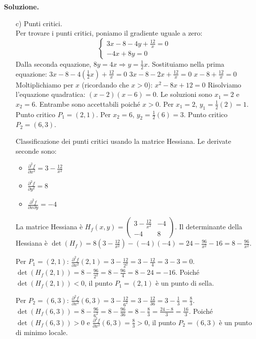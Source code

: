 \documentclass[12pt, a4paper]{article}
\newenvironment{solution}{%
    \par\noindent\textbf{Soluzione.}\medskip\par
    \normalfont
}{\par\bigskip}
\begin{document}
\begin{solution}
\begin{enumerate}
    \item[c)] Punti critici.\\
    Per trovare i punti critici, poniamo il gradiente uguale a zero:
    \[ \begin{cases} 3x - 8 - 4y + \frac{12}{x} = 0 \\ -4x + 8y = 0 \end{cases} \]
    Dalla seconda equazione, \(8y = 4x \Rightarrow y = \frac{1}{2}x\).
    Sostituiamo nella prima equazione:
    \( 3x - 8 - 4(\frac{1}{2}x) + \frac{12}{x} = 0 \)
    \( 3x - 8 - 2x + \frac{12}{x} = 0 \)
    \( x - 8 + \frac{12}{x} = 0 \)
    Moltiplichiamo per \(x\) (ricordando che \(x>0\)):
    \( x^2 - 8x + 12 = 0 \)
    Risolviamo l'equazione quadratica: \( (x-2)(x-6) = 0 \).
    Le soluzioni sono \(x_1 = 2\) e \(x_2 = 6\). Entrambe sono accettabili poiché \(x>0\).
    Per \(x_1 = 2\), \(y_1 = \frac{1}{2}(2) = 1\). Punto critico \(P_1 = (2,1)\).
    Per \(x_2 = 6\), \(y_2 = \frac{1}{2}(6) = 3\). Punto critico \(P_2 = (6,3)\).

    Classificazione dei punti critici usando la matrice Hessiana.
    Le derivate seconde sono:
    \begin{itemize}
        \item \( \frac{\partial^2 f}{\partial x^2} = 3 - \frac{12}{x^2} \)
        \item \( \frac{\partial^2 f}{\partial y^2} = 8 \)
        \item \( \frac{\partial^2 f}{\partial x \partial y} = -4 \)
    \end{itemize}
    La matrice Hessiana è \( H_f(x,y) = \begin{pmatrix} 3 - \frac{12}{x^2} & -4 \\ -4 & 8 \end{pmatrix} \).
    Il determinante della Hessiana è \( \det(H_f) = 8(3 - \frac{12}{x^2}) - (-4)(-4) = 24 - \frac{96}{x^2} - 16 = 8 - \frac{96}{x^2} \).

    Per \(P_1 = (2,1)\):
    \( \frac{\partial^2 f}{\partial x^2}(2,1) = 3 - \frac{12}{2^2} = 3 - \frac{12}{4} = 3 - 3 = 0 \).
    \( \det(H_f(2,1)) = 8 - \frac{96}{2^2} = 8 - \frac{96}{4} = 8 - 24 = -16 \).
    Poiché \( \det(H_f(2,1)) < 0 \), il punto \(P_1 = (2,1)\) è un punto di sella.

    Per \(P_2 = (6,3)\):
    \( \frac{\partial^2 f}{\partial x^2}(6,3) = 3 - \frac{12}{6^2} = 3 - \frac{12}{36} = 3 - \frac{1}{3} = \frac{8}{3} \).
    \( \det(H_f(6,3)) = 8 - \frac{96}{6^2} = 8 - \frac{96}{36} = 8 - \frac{8}{3} = \frac{24-8}{3} = \frac{16}{3} \).
    Poiché \( \det(H_f(6,3)) > 0 \) e \( \frac{\partial^2 f}{\partial x^2}(6,3) = \frac{8}{3} > 0 \), il punto \(P_2 = (6,3)\) è un punto di minimo locale.
\end{enumerate}
\end{solution}
\end{document}

